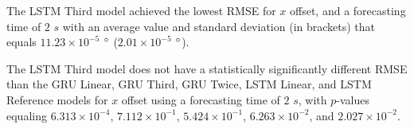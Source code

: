 \documentclass[preprint,12pt]{elsarticle}
\begin{document}
\begin{table}[!ht]
	\centering
	\caption{The average RMSE in $\degree$ ($\times 10^{-4}$), with standard deviation in brackets, across $k$-fold validation datasets for the $x$ offset estimated on the $k$-fold testing datasets by different RNN models, and forecasting times.}
	\label{tab:best_longitude_no_abs_RMSE}
\end{table}

The LSTM Third model achieved the lowest RMSE for $x$ offset, and a forecasting time of $2$ $s$ with an average value and standard deviation (in brackets) that equals $11.23 \times 10^{-5}$ $\degree$ ($2.01 \times 10^{-5}$ $\degree$).

The LSTM Third model does not have a statistically significantly different RMSE than the GRU Linear, GRU Third, GRU Twice, LSTM Linear, and LSTM Reference models for $x$ offset using a forecasting time of $2$ $s$, with $p$-values equaling $6.313 \times 10^{-4}$, $7.112 \times 10^{-1}$, $5.424 \times 10^{-1}$, $6.263 \times 10^{-2}$, and $2.027 \times 10^{-2}$.
\end{document}
